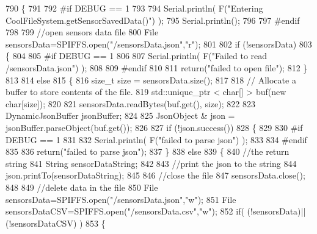 \begin{DoxyCode}
790 \{
791 
792 \textcolor{preprocessor}{#if DEBUG == 1 }
793 
794     Serial.println( F(\textcolor{stringliteral}{"Entering CoolFileSystem.getSensorSavedData()"}) );
795     Serial.println();
796 
797 \textcolor{preprocessor}{#endif}
798 
799     \textcolor{comment}{//open sensors data file}
800     File sensorsData=SPIFFS.open(\textcolor{stringliteral}{"/sensorsData.json"},\textcolor{stringliteral}{"r"});
801     
802     \textcolor{keywordflow}{if} (!sensorsData)
803     \{
804 
805 \textcolor{preprocessor}{    #if DEBUG == 1 }
806 
807         Serial.println( F(\textcolor{stringliteral}{"Failed to read /sensorsData.json"}) );
808 
809 \textcolor{preprocessor}{    #endif}
810  
811         \textcolor{keywordflow}{return}(\textcolor{stringliteral}{"failed to open file"});
812     \}
813 
814     \textcolor{keywordflow}{else}
815     \{
816         \textcolor{keywordtype}{size\_t} size = sensorsData.size();
817 
818         \textcolor{comment}{// Allocate a buffer to store contents of the file.}
819         std::unique\_ptr < char[] > buf(\textcolor{keyword}{new} \textcolor{keywordtype}{char}[size]);
820 
821         sensorsData.readBytes(buf.get(), size);
822 
823         DynamicJsonBuffer jsonBuffer;
824 
825         JsonObject & json = jsonBuffer.parseObject(buf.get());
826         
827         \textcolor{keywordflow}{if} (!json.success())
828         \{
829 
830 \textcolor{preprocessor}{        #if DEBUG == 1}
831         
832             Serial.println( F(\textcolor{stringliteral}{"failed to parse json"}) );
833         
834 \textcolor{preprocessor}{        #endif}
835         
836             \textcolor{keywordflow}{return}(\textcolor{stringliteral}{"failed to parse json"});
837         \}
838         \textcolor{keywordflow}{else}
839         \{   
840             \textcolor{comment}{//the return string}
841             String sensorDataString;
842             
843             \textcolor{comment}{//print the json to the string}
844             json.printTo(sensorDataString);
845             
846             \textcolor{comment}{//close the file}
847             sensorsData.close();
848 
849             \textcolor{comment}{//delete data in the file}
850             File sensorsData=SPIFFS.open(\textcolor{stringliteral}{"/sensorsData.json"},\textcolor{stringliteral}{"w"});
851             File sensorsDataCSV=SPIFFS.open(\textcolor{stringliteral}{"/sensorsData.csv"},\textcolor{stringliteral}{"w"});
852             \textcolor{keywordflow}{if}( (!sensorsData)||(!sensorsDataCSV) ) 
853             \{

\end{DoxyCode}
